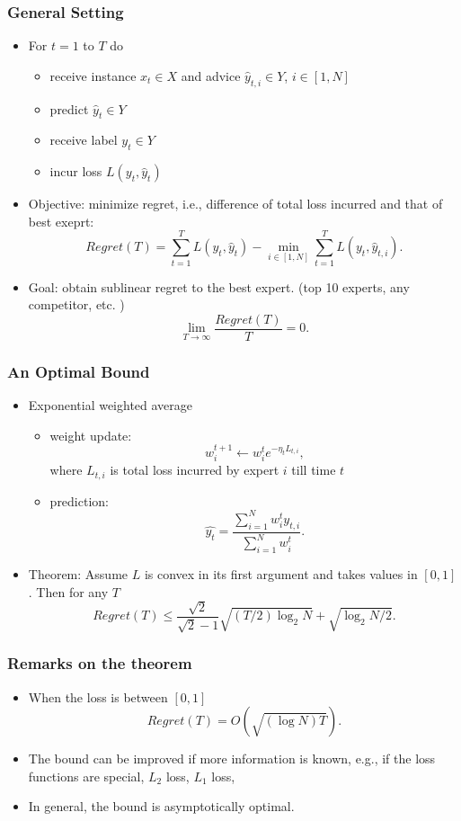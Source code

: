 \documentclass{beamer}
\begin{document}
\begin{frame}
\frametitle{General Setting}
\begin{itemize}
\item{For $t = 1$ to $T$ do}
	\begin{itemize}
	\item{receive instance $x_t\in X$ and advice $\hat{y}_{t,i}\in Y$, $i\in [1,N]$}
	\item{predict $\hat{y}_t\in Y$}
	\item{receive label $y_t\in Y$}
	\item{incur loss $L(y_t,\hat{y}_t)$}
	\end{itemize}
\pause
\item {\color{red}Objective:} minimize regret, i.e., difference of total loss incurred and that of best exeprt:
$$Regret(T) = \sum_{t=1}^TL(y_t,\hat{y}_t)-\min_{i\in[1,N]}\sum_{t=1}^TL(y_t,\hat{y}_{t,i}).$$
\pause	
\item Goal: obtain {\color{red}sublinear regret} to the {\color{red}best expert}. (top 10 experts, any competitor, etc. )
$$\lim_{T\to \infty}\frac{Regret(T)}{T} = 0.$$
\end{itemize}


\end{frame}

\begin{frame}
\frametitle{An Optimal Bound}
\begin{itemize}
\item Exponential weighted average

\begin{itemize}
\item weight update:
$$w_i^{t+1} \leftarrow w_i^t e^{-\eta_t L_{t,i}},$$
where $L_{t,i}$ is total loss incurred by expert $i$ till time $t$
\item prediction:
$$\hat{y_t} = \frac{\sum_{i=1}^Nw_{i}^ty_{t,i}}{\sum_{i=1}^Nw_{i}^t}.$$ 
\end{itemize}
\pause
\item Theorem: Assume $L$ is convex in its first argument and takes values in $[0,1]$. Then for any $T$
$$Regret(T)\le \frac{\sqrt{2}}{\sqrt{2}-1}\sqrt{(T/2)\log_2 N}+\sqrt{\log_2 N/2}.$$


\end{itemize}


\end{frame}
\begin{frame}
\frametitle{Remarks on the theorem}
\begin{itemize}
\item When the loss is between $[0,1]$ 
$$Regret(T) = O(\sqrt{(\log N) T}).$$
\pause
\item The bound can be improved if more information is known, e.g., if the loss functions are special, $L_2$ loss, $L_1$ loss, 
\pause
\item In general, the bound is asymptotically optimal. 

\end{itemize}


\end{frame}
\end{document}

